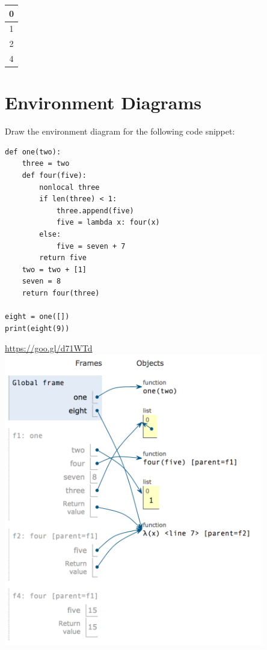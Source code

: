 \documentclass{exam}
\begin{document}
\begin{questions}
\begin{blocksection}
\begin{solution}
\begin{tabular}{|c|}
\hline
0\\\hline
1\\\hline
2\\\hline
4\\\hline
\end{tabular}
\end{solution}

\end{blocksection}

\section{Environment Diagrams}

\begin{blocksection}
\question Draw the environment diagram for the following code snippet:
\begin{lstlisting}
def one(two):
    three = two
    def four(five):
        nonlocal three
        if len(three) < 1:
            three.append(five)
            five = lambda x: four(x)
        else:
            five = seven + 7
        return five
    two = two + [1]
    seven = 8
    return four(three)

eight = one([])
print(eight(9))
\end{lstlisting}
\end{blocksection}

\begin{solution}
\url{https://goo.gl/d71WTd}
\linebreak
\includegraphics[width=0.85\textwidth]{envdiag}


\end{solution}
\end{questions}
\end{document}
